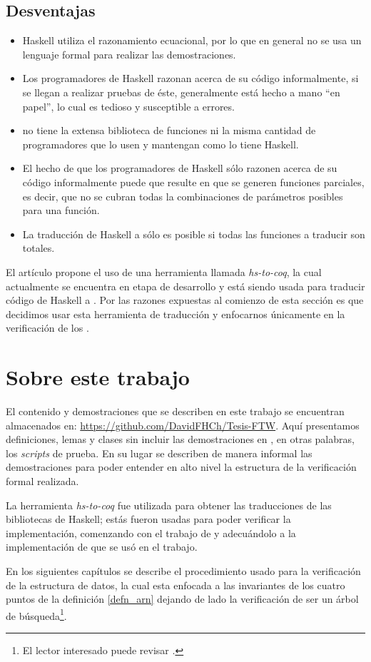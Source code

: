 \subsection{Desventajas}
\begin{itemize}
    \item Haskell utiliza el razonamiento ecuacional, por lo que en general no se usa un lenguaje 
    formal para realizar las demostraciones.
    \item Los programadores de Haskell razonan acerca de su código informalmente, si se llegan a
    realizar pruebas de \'este, generalmente est\'a hecho a mano ``en papel'', lo cual es tedioso y
    susceptible a errores.
    \item {\coq} no tiene la extensa biblioteca de funciones ni la misma cantidad de programadores
    que lo usen y mantengan como lo tiene Haskell.
    \item El hecho de que los programadores de Haskell s\'olo razonen acerca de su código
    informalmente puede que resulte en que se generen funciones parciales, es decir, que no se
    cubran todas la combinaciones de parámetros posibles para una funci\'on.
    \item La traducci\'on de Haskell a {\coq} s\'olo es posible si todas las funciones a traducir 
    son totales.
\end{itemize}

El art\'iculo propone el uso de una herramienta llamada \textit{hs-to-coq}, la cual actualmente se
encuentra en etapa de desarrollo y est\'a siendo usada para traducir código de Haskell a {\coq}. Por
las razones expuestas al comienzo de esta secci\'on es que decidimos usar esta herramienta de 
traducci\'on y enfocarnos \'unicamente en la verificaci\'on de los {\arns}.

\section{Sobre este trabajo}
El contenido y demostraciones que se describen en este trabajo se encuentran almacenados en:
\url{https://github.com/DavidFHCh/Tesis-FTW}. Aqu\'i presentamos definiciones, lemas y clases sin
incluir las demostraciones en {\coq}, en otras palabras, los \emph{scripts} de prueba. En su lugar se 
describen de manera informal las demostraciones para poder entender en alto nivel la estructura de 
la verificaci\'on formal realizada.

La herramienta \textit{hs-to-coq} fue utilizada para obtener las traducciones de las bibliotecas de Haskell; est\'as fueron
usadas para poder verificar la implementación, comenzando con el trabajo de \cite{tesisG} y 
adecuándolo a la implementaci\'on de \cite{MSetRBT} que se us\'o en el trabajo.

En los siguientes capítulos se describe el procedimiento usado para la verificaci\'on de la
estructura de datos, la cual esta enfocada a las invariantes de los cuatro puntos de la definici\'on
 \ref{defn_arn} dejando de lado la verificaci\'on de ser un \'arbol de b\'usqueda\footnote{El lector
  interesado puede revisar \cite{appel}.}.
